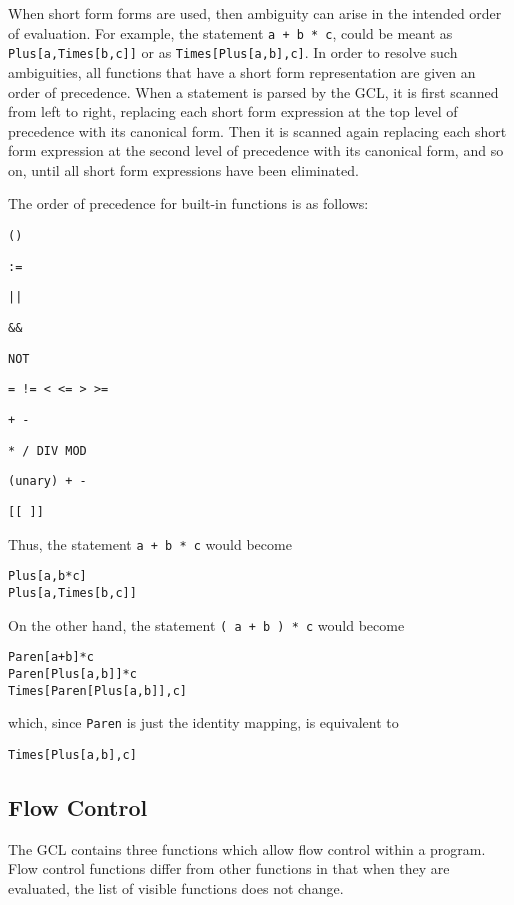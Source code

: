 When short form forms are used, then ambiguity can arise in the
intended order of evaluation.  For example, the statement \verb&a + b * c&,
could be meant as \verb+Plus[a,Times[b,c]]+ or as
\verb+Times[Plus[a,b],c]+.  In order to resolve such ambiguities, all
functions that have a short form representation are given an order of
precedence.  When a statement is parsed by the GCL, it is first
scanned from left to right, replacing each short form expression at the
top level of precedence with its canonical form.  Then it is scanned
again replacing each short form expression at the second level of
precedence with its canonical form, and so on, until all short form
expressions have been eliminated.  

The order of precedence for built-in functions is as follows:
\bd
\item
\verb+()+
\item
\verb+:=+
\item
\verb+||+
\item
\verb+&&+
\item
\verb+NOT+
\item
\verb+= != < <= > >=+
\item
\verb&+ -&
\item
\verb+* / DIV MOD+
\item
\verb&(unary) + -&
\item
\verb+[[ ]]+
\ed

Thus, the statement \verb&a + b * c& would become 
\begin{verbatim}
Plus[a,b*c]
Plus[a,Times[b,c]]
\end{verbatim}

\noindent
On the other hand, the statement \verb&( a + b ) * c& would become 
\begin{verbatim}
Paren[a+b]*c
Paren[Plus[a,b]]*c
Times[Paren[Plus[a,b]],c]
\end{verbatim}

\noindent
which, since \verb+Paren+ is just the identity mapping, is equivalent to
\begin{verbatim}
Times[Plus[a,b],c]
\end{verbatim}

\subsection{Flow Control}

The GCL contains three functions which allow flow control within a
program.  Flow control functions differ from other functions in that
when they are evaluated, the list of visible functions does not
change.

